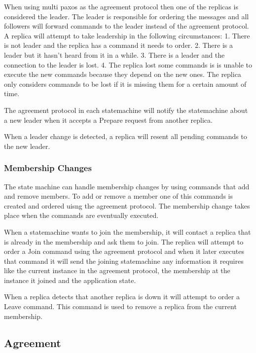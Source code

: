 \documentclass[sigconf]{acmart}
\begin{document}
When using multi paxos as the agreement protocol then one of the replicas is considered the leader.
The leader is responsible for ordering the messages and all followers will forward commands to the leader
instead of the agreement protocol.
A replica will attempt to take leadership in the following circumstances:
1. There is not leader and the replica has a command it needs to order.
2. There is a leader but it hasn't heard from it in a while.
3. There is a leader and the connection to the leader is lost.
4. The replica lost some commands is is unable to execute the new commands
    because they depend on the new ones. The replica only considers commands
    to be lost if it is missing them for a certain amount of time.

The agreement protocol in each statemachine will notify the statemachine about a new leader
when it accepts a Prepare request from another replica.

When a leader change is detected, a replica will resent all pending commands to the new leader.


\subsubsection{Membership Changes}


The state machine can handle membership changes by using commands that add and remove members.
To add or remove a member one of this commands is created and ordered uisng the agreement protocol.
The membership change takes place when the commands are eventually executed.

When a statemachine wants to join the membership, it will contact a replica that is already in the membership and ask them to join.
The replica will attempt to order a Join command using the agreement protocol and when it later executes that command it will send
the joining statemachine any information it requires like the current instance in the agreement protocol, the membership at the instance
it joined and the application state.

When a replica detects that another replica is down it will attempt to order a Leave command.
This command is used to remove a replica from the current membership.

\subsection{Agreement}
\end{document}
